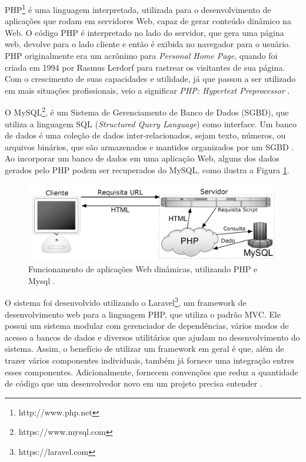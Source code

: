 PHP\footnote{http://www.php.net} é uma linguagem interpretada, utilizada para o desenvolvimento de aplicações que rodam em servidores Web, capaz de gerar conteúdo dinâmico na Web. O código PHP é interpretado no lado do servidor, que gera uma página web, devolve para o lado cliente e então é exibida no navegador para o usuário. PHP originalmente era um acrônimo para \textit{Personal Home Page}, quando foi criada em 1994 por Rasmus Lerdorf para rastrear os visitantes de sua página. Com o crescimento de suas capacidades e utilidade, já que passou a ser utilizado em mais situações profissionais, veio a significar \textit{PHP: Hypertext Preprocessor} \citep{ullman2009php}.

O MySQL\footnote{https://www.mysql.com}, é um Sistema de Gerenciamento de Banco de Dados (SGBD), que utiliza a linguagem SQL (\textit{Structured Query Language}) como interface. Um banco de dados é uma coleção de dados inter-relacionados, sejam texto, números, ou arquivos binários, que são armazenados e mantidos organizados por um SGBD \citep{ullman2009php}. Ao incorporar um banco de dados em uma aplicação Web, alguns dos dados gerados pelo PHP podem ser recuperados do MySQL, como ilustra a Figura \ref{fig:php-mysql}.

\begin{figure}
	\centering
	\includegraphics[scale=0.2]{imagens/php-mysql.png}
	\caption{Funcionamento de aplicações Web dinâmicas, utilizando PHP e Mysql \citep{ullman2009php}.}
	\label{fig:php-mysql}
\end{figure}

O sistema foi desenvolvido utilizando o Laravel\footnote{https://laravel.com}, um framework de desenvolvimento web para a linguagem PHP, que utiliza o padrão MVC. Ele possui um sistema modular com gerenciador de dependências, vários modos de acesso a bancos de dados e diversos utilitários que ajudam no desenvolvimento do sistema. Assim, o benefício de utilizar um framework em geral é que, além de trazer vários componentes individuais, também já fornece uma integração entres esses componentes. Adicionalmente, fornecem convenções que reduz a quantidade de código que um desenvolvedor novo em um projeto precisa entender \citep{stauffer2016laravel}.

